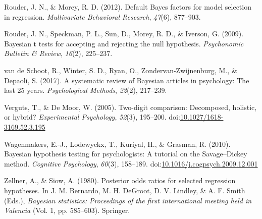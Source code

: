 \documentclass[english,,doc,floatsintext]{apa6}
\begin{document}
\leavevmode\hypertarget{ref-rouder2012defaultRegression}{}%
Rouder, J. N., \& Morey, R. D. (2012). Default Bayes factors for model selection in regression. \emph{Multivariate Behavioral Research}, \emph{47}(6), 877--903.

\leavevmode\hypertarget{ref-rouder2009bayesian}{}%
Rouder, J. N., Speckman, P. L., Sun, D., Morey, R. D., \& Iverson, G. (2009). Bayesian t tests for accepting and rejecting the null hypothesis. \emph{Psychonomic Bulletin \& Review}, \emph{16}(2), 225--237.

\leavevmode\hypertarget{ref-vandeschoot2017systematic}{}%
van de Schoot, R., Winter, S. D., Ryan, O., Zondervan-Zwijnenburg, M., \& Depaoli, S. (2017). A systematic review of Bayesian articles in psychology: The last 25 years. \emph{Psychological Methods}, \emph{22}(2), 217--239.

\leavevmode\hypertarget{ref-vergutsDeMoor2005}{}%
Verguts, T., \& De Moor, W. (2005). Two-digit comparison: Decomposed, holistic, or hybrid? \emph{Experimental Psychology}, \emph{52}(3), 195--200. doi:\href{https://doi.org/10.1027/1618-3169.52.3.195}{10.1027/1618-3169.52.3.195}

\leavevmode\hypertarget{ref-wagenmakers2010}{}%
Wagenmakers, E.-J., Lodewyckx, T., Kuriyal, H., \& Grasman, R. (2010). Bayesian hypothesis testing for psychologists: A tutorial on the Savage--Dickey method. \emph{Cognitive Psychology}, \emph{60}(3), 158--189. doi:\href{https://doi.org/10.1016/j.cogpsych.2009.12.001}{10.1016/j.cogpsych.2009.12.001}

\leavevmode\hypertarget{ref-zellner1980posterior}{}%
Zellner, A., \& Siow, A. (1980). Posterior odds ratios for selected regression hypotheses. In J. M. Bernardo, M. H. DeGroot, D. V. Lindley, \& A. F. Smith (Eds.), \emph{Bayesian statistics: Proceedings of the first international meeting held in Valencia} (Vol. 1, pp. 585--603). Springer.
\end{document}
